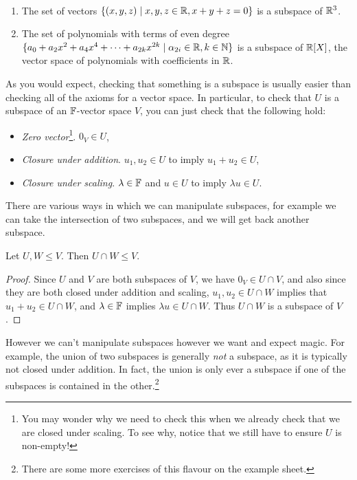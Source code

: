 \documentclass[a4paper]{scrartcl}
\begin{document}
\begin{example}~
    \vspace{-1.5\baselineskip}
    \begin{enumerate}[label=(\roman*)]
        \item The set of vectors $\{(x, y, z) \mid x, y, z \in \mathbb{R}, x + y + z = 0\}$ is a subspace of $\mathbb{R}^3$.
        \item The set of polynomials with terms of even degree $\{ a_0 + a_2 x^2 + a_4 x^4 + \cdots + a_{2k} x^{2k} \mid \alpha_{2i} \in \mathbb{R}, k \in \mathbb{N}\}$ is a subspace of $\mathbb{R}[X]$, the vector space of polynomials with coefficients in $\mathbb{R}$.
    \end{enumerate}
\end{example}

As you would expect, checking that something is a subspace is usually easier than checking all of the axioms for a vector space. In particular, to check that $U$ is a subspace of an $\mathbb{F}$-vector space $V$, you can just check that the following hold:
\begin{itemize}
    \item \emph{Zero vector}\footnote{You may wonder why we need to check this when we already check that we are closed under scaling. To see why, notice that we still have to ensure $U$ is non-empty!}. $0_V \in U$,
    \item \emph{Closure under addition}. $u_1, u_2 \in U$ to imply $u_1 + u_2 \in U$,
    \item \emph{Closure under scaling}. $\lambda \in \mathbb{F}$ and $u \in U$ to imply $\lambda u \in U$.
\end{itemize}


There are various ways in which we can manipulate subspaces, for example we can take the intersection of two subspaces, and we will get back another subspace. 

\begin{proposition}
    Let $U, W \leq V$. Then $U \cap W \leq V$.
\end{proposition}
\begin{proof}
    Since $U$ and $V$ are both subspaces of $V$, we have $0_V \in U \cap V$, and also since they are both closed under addition and scaling, $u_1, u_2 \in U \cap W$ implies that $u_1 + u_2 \in U \cap W$, and $\lambda \in \mathbb{F}$ implies $\lambda u \in U\cap W$. Thus $U \cap W$ is a subspace of $V$. 
\end{proof}

However we can't manipulate subspaces however we want and expect magic. For example, the union of two subspaces is generally \emph{not} a subspace, as it is typically not closed under addition. In fact, the union is only ever a subspace if one of the subspaces is contained in the other.\footnote{There are some more exercises of this flavour on the example sheet.}
\end{document}

